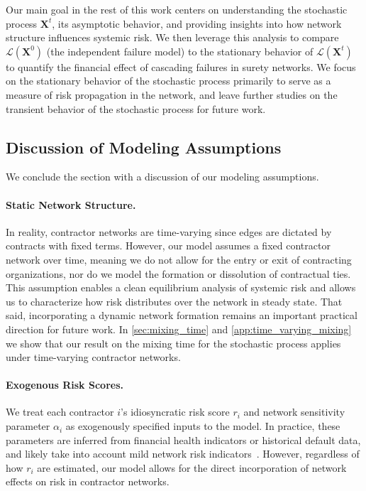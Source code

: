 \documentclass[mnsc,nonblindrev]{informs3}
\newcommand{\GAR}{\mathcal{L}}
\newcommand{\Xvec}{\mathbf{X}}
\begin{document}
%

Our main goal in the rest of this work centers on understanding the stochastic process $\Xvec^t$, its asymptotic behavior, and providing insights into how network structure influences systemic risk.  We then leverage this analysis to compare $\GAR(\Xvec^0)$ (the independent failure model) to the stationary behavior of $\GAR(\Xvec^t)$ to quantify the financial effect of cascading failures in surety networks.  We focus on the stationary behavior of the stochastic process primarily to serve as a measure of risk propagation in the network, and leave further studies on the transient behavior of the stochastic process for future work.





\subsection{Discussion of Modeling Assumptions}

We conclude the section with a discussion of our modeling assumptions.

\paragraph{Static Network Structure.} 
In reality, contractor networks are time-varying since edges are dictated by contracts with fixed terms. However, our model assumes a fixed contractor network over time, meaning we do not allow for the entry or exit of contracting organizations, nor do we model the formation or dissolution of contractual ties. This assumption enables a clean equilibrium analysis of systemic risk and allows us to characterize how risk distributes over the network in steady state. That said, incorporating a dynamic network formation remains an important practical direction for future work. In \cref{sec:mixing_time} and \cref{app:time_varying_mixing} we show that our result on the mixing time for the stochastic process applies under time-varying contractor networks.

\paragraph{Exogenous Risk Scores.} We treat each contractor $i$'s idiosyncratic risk score $r_i$ and network sensitivity parameter $\alpha_i$ as exogenously specified inputs to the model. In practice, these parameters are inferred from financial health indicators or historical default data, and likely take into account mild network risk indicators~\citep{kim2019default}. However, regardless of how $r_i$ are estimated, our model allows for the direct incorporation of network effects on risk in contractor networks.
\end{document}
